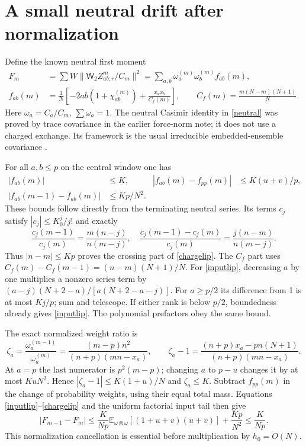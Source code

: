\documentclass[11pt,a4paper]{article}
\newcommand{\EE}{\mathbb E}
\newcommand{\W}{\mathsf W_2}
\begin{document}
\newpage
\section{A small neutral drift after normalization}
Define the known neutral first moment
\begin{align}
 F_m&=\sum W\|\W Z^m_{ab;r}/C_m\|^2
       =\sum_{a,b}\omega_a^{(m)}\omega_b^{(m)}f_{ab}(m),\\
 f_{ab}(m)&=\frac1N\left[-2ab(1+\chi^{(m)}_{ab})+
                       \frac{x_ax_b}{C_f(m)}\right],\qquad
 C_f(m)=\frac{m(N-m)(N+1)}N.\label{neutral}
\end{align}
Here $\omega_a=C_a/C_m$, $\sum\omega_a=1$. The neutral
Casimir identity in \eqref{neutral} was proved by trace covariance
in the earlier force-norm note; it does not use a charged exchange.
Its framework is the usual irreducible embedded-ensemble covariance
\cite{TT,local}.

For all $a,b\le p$ on the central window one has
\begin{align}
 |f_{ab}(m)|&\le K,&
 |f_{ab}(m)-f_{pp}(m)|&\le K(u+v)/p,\label{inputlip}\\
 |f_{ab}(m-1)-f_{ab}(m)|&\le Kp/N^2.\label{chargelip}
\end{align}
These bounds follow directly from the terminating neutral series.
Its terms $c_j$ satisfy $|c_j|\le K_0^j/j!$ and exactly
\begin{equation}
 \frac{c_j(m-1)}{c_j(m)}=\frac{m(n-j)}{n(m-j)},\quad
 \frac{c_j(m-1)-c_j(m)}{c_j(m)}=\frac{j(n-m)}{n(m-j)}.
\end{equation}
Thus $|n-m|\le Kp$ proves the crossing part of \eqref{chargelip}.
The $C_f$ part uses $C_f(m)-C_f(m-1)=(n-m)(N+1)/N$.
For \eqref{inputlip}, decreasing $a$ by one multiplies a nonzero
series term by $(a-j)(N+2-a)/[a(N+2-a-j)]$.
For $a\ge p/2$ its difference from 1 is at most $Kj/p$;
sum and telescope. If either rank is below $p/2$, boundedness
already gives \eqref{inputlip}. The polynomial prefactors obey
the same bound.

The exact normalized weight ratio is
\begin{equation}
 \zeta_a=\frac{\omega_a^{(m-1)}}{\omega_a^{(m)}}
 =\frac{(m-p)n^2}{(n+p)(mn-x_a)},\qquad
 \zeta_a-1=\frac{(n+p)x_a-pn(N+1)}{(n+p)(mn-x_a)}.
\end{equation}
At $a=p$ the last numerator is $p^2(m-p)$; changing $a$ to
$p-u$ changes it by at most $KuN^2$. Hence
$|\zeta_a-1|\le K(1+u)/N$ and $\zeta_a\le K$.
Subtract $f_{pp}(m)$ in the change of probability weights, using
their equal total mass. Equations \eqref{inputlip}--\eqref{chargelip}
and the uniform factorial input tail then give
\begin{equation}
 |F_{m-1}-F_m|\le \frac{K}{Np}
 \EE_{\omega\otimes\omega}[(1+u+v)(u+v)]+\frac{Kp}{N^2}
 \le\frac K{Np}.\label{drift}
\end{equation}
This normalization cancellation is essential before multiplication
by $h_0=O(N)$.
\end{document}
